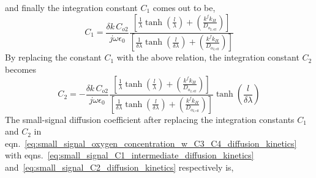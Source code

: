 \documentclass[Notes.tex]{subfiles}
\begin{document}
and finally the integration constant $C_1$ comes out to be, 	 	
\begin{equation}
	 C_1 = \frac{\delta k\, C_{o2}} {j\omega\epsilon_0} \frac{\left[\frac{1}{\lambda}  \tanh{\left(\frac{l}{\lambda}\right)} + \left(\frac{k^f k_H} {D_{o_{2,\textrm{eff}}}}\right) \right]}{\left[ \frac{1} {\delta\lambda} \tanh{\left(\frac{l}{\delta\lambda}\right)} + \left(\frac{k^f	k_H} {D_{o_{2,\textrm{eff}}}}\right) \right]}\label{eq:small_signal_C1_intermediate_diffusion_kinetics}
\end{equation}
By replacing the constant $C_1$ with the above relation, the integration constant $C_2$ becomes
\begin{equation}
	C_2 = - \frac{\delta k\, C_{o2}} {j\omega\epsilon_0} \frac{\left[\frac{1}{\lambda}  \tanh{\left(\frac{l}{\lambda}\right)} + \left(\frac{k^f k_H} {D_{o_{2,\textrm{eff}}}}\right) \right]}{\left[ \frac{1} {\delta\lambda} \tanh{\left(\frac{l}{\delta\lambda}\right)} + \left(\frac{k^f	k_H} {D_{o_{2,\textrm{eff}}}}\right) \right]} \tanh{\left(\frac{l}{\delta\lambda}\right)}\label {eq:small_signal_C2_diffusion_kinetics}
\end{equation} 
The small-signal diffusion coefficient after replacing the integration constants $C_1$ and $C_2$ in eqn.~\ref{eq:small_signal_oxygen_concentration_w_C3_C4_diffusion_kinetics} with eqns.~\ref{eq:small_signal_C1_intermediate_diffusion_kinetics} and~\ref{eq:small_signal_C2_diffusion_kinetics} respectively is,
\end{document}
